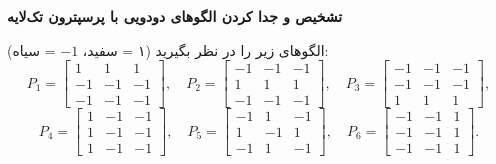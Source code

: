 \documentclass[12pt]{exam}
\begin{document}
	
	\vspace{1em}
	
	\begin{questions}
		
		\question
		\textbf{تشخیص و جدا کردن الگوهای دودویی با پرسپترون تک‌لایه}
		
		الگوهای زیر را در نظر بگیرید (۱ = سفید، \(-1\) = سیاه):
		\[
		P_1 = 
		\begin{bmatrix}
			1 & 1 & 1\\
			-1 & -1 & -1\\
			-1 & -1 & -1
		\end{bmatrix},\quad
		P_2 = 
		\begin{bmatrix}
			-1 & -1 & -1\\
			1 & 1 & 1\\
			-1 & -1 & -1
		\end{bmatrix},\quad
		P_3 = 
		\begin{bmatrix}
			-1 & -1 & -1\\
			-1 & -1 & -1\\
			1 & 1 & 1
		\end{bmatrix},
		\]
		\[
		P_4 = 
		\begin{bmatrix}
			1 & -1 & -1\\
			1 & -1 & -1\\
			1 & -1 & -1
		\end{bmatrix},\quad
		P_5 = 
		\begin{bmatrix}
			-1 & 1 & -1\\
			1 & -1 & 1\\
			-1 & 1 & -1
		\end{bmatrix},\quad
		P_6 = 
		\begin{bmatrix}
			-1 & -1 & 1\\
			-1 & -1 & 1\\
			-1 & -1 & 1
		\end{bmatrix}.
		\]
		
\end{questions}
\end{document}
